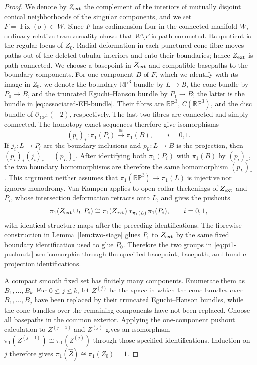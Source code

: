 \documentclass[11pt]{article}
\theoremstyle{remark}\newtheorem{remark}[theorem]{Remark}
\newcommand{\Fix}{\operatorname{Fix}}
\newcommand{\RP}{\mathbb {RP}}
\newcommand{\CP}{\mathbb {CP}}
\begin{document}
\begin{proof}
We denote by $Z_{\rm ext}$ the complement of the interiors of mutually
disjoint conical neighborhoods of the singular components, and we set
$F=\Fix(\sigma)\subset W$.  Since $F$ has codimension four in the connected
manifold $W$, ordinary relative transversality shows that $W\setminus F$
is path connected.  Its quotient is the regular locus of $Z_0$.  Radial
deformation in each punctured cone fibre moves paths out of the deleted
tubular interiors and onto their boundaries; hence $Z_{\rm ext}$ is path
connected.  We choose a basepoint in $Z_{\rm ext}$ and compatible
basepaths to the boundary components.  For one component $B$ of $F$, which
we identify with its image in $Z_0$, we denote
the boundary $\RP^3$-bundle by $L\to B$, the cone bundle by $P_0\to B$,
and the truncated Eguchi--Hanson bundle by $P_1\to B$; the latter is the
bundle in \eqref{eq:associated-EH-bundle}.  Their fibres are
$\RP^3$, $C(\RP^3)$, and the disc bundle of
$\mathcal O_{\CP^1}(-2)$, respectively.  The last two fibres are connected
and simply connected.  The homotopy exact sequences therefore give
isomorphisms
\[
(p_i)_*:\pi_1(P_i)\xrightarrow{\ \cong\ }\pi_1(B),\qquad i=0,1.
\]
If $j_i:L\to P_i$ are the boundary inclusions and $p_L:L\to B$ is the
projection, then $(p_i)_*(j_i)_*=(p_L)_*$.  After identifying both
$\pi_1(P_i)$ with $\pi_1(B)$ by $(p_i)_*$, the two boundary homomorphisms
are therefore the same homomorphism $(p_L)_*$.  This argument neither assumes that
$\pi_1(\RP^3)\to\pi_1(L)$ is injective nor ignores monodromy.  Van Kampen
applies to open collar thickenings of $Z_{\rm ext}$ and $P_i$, whose
intersection deformation retracts onto $L$, and gives the pushouts
\begin{equation}\label{eq:pi1-pushouts}
 \pi_1(Z_{\rm ext}\cup_LP_i)
 \cong \pi_1(Z_{\rm ext})*_{\pi_1(L)}\pi_1(P_i),
 \qquad i=0,1,
\end{equation}
with identical structure maps after the preceding identifications.  The
fibrewise construction in Lemma~\ref{lem:two-stage} glues $P_1$ to
$Z_{\rm ext}$ by the same fixed boundary identification used to glue
$P_0$.  Therefore the two groups in
\eqref{eq:pi1-pushouts} are isomorphic through the specified basepoint,
basepath, and bundle-projection identifications.

A compact smooth fixed set has finitely many components.  Enumerate them
as $B_1,\ldots,B_k$.  For $0\leq j\leq k$, let $Z^{(j)}$ be the space in
which the cone bundles over $B_1,\ldots,B_j$ have been replaced by their
truncated Eguchi--Hanson bundles, while the cone bundles over the remaining
components have not been replaced.  Choose all basepaths in the common
exterior.  Applying the one-component pushout calculation to
$Z^{(j-1)}$ and $Z^{(j)}$ gives an isomorphism
$\pi_1(Z^{(j-1)})\cong\pi_1(Z^{(j)})$ through those specified
identifications.  Induction on $j$ therefore gives
$\pi_1(\widehat Z)\cong\pi_1(Z_0)=1$.
\end{proof}
\end{document}

